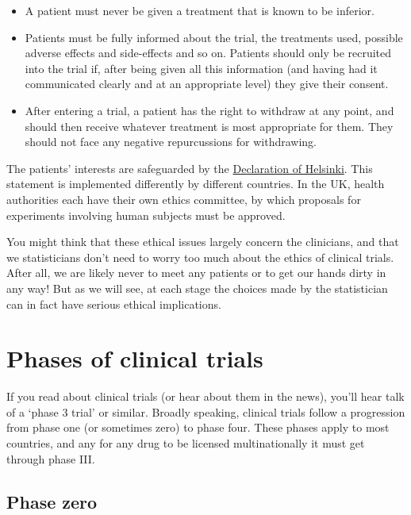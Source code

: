 \documentclass[
  openany]{book}
\providecommand{\tightlist}{%
  \setlength{\itemsep}{0pt}\setlength{\parskip}{0pt}}
\theoremstyle{definition}
\theoremstyle{definition}
\theoremstyle{definition}
\theoremstyle{definition}
\theoremstyle{remark}
\begin{document}
\begin{itemize}
\tightlist
\item
  A patient must never be given a treatment that is known to be inferior.
\item
  Patients must be fully informed about the trial, the treatments used, possible adverse effects and side-effects and so on. Patients should only be recruited into the trial if, after being given all this information (and having had it communicated clearly and at an appropriate level) they give their consent.
\item
  After entering a trial, a patient has the right to withdraw at any point, and should then receive whatever treatment is most appropriate for them. They should not face any negative repurcussions for withdrawing.
\end{itemize}

The patients' interests are safeguarded by the \href{https://www.wma.net/policies-post/wma-declaration-of-helsinki-ethical-principles-for-medical-research-involving-human-subjects/}{Declaration of Helsinki}. This statement is implemented differently by different countries. In the UK, health authorities each have their own ethics committee, by which proposals for experiments involving human subjects must be approved.

You might think that these ethical issues largely concern the clinicians, and that we statisticians don't need to worry too much about the ethics of clinical trials. After all, we are likely never to meet any patients or to get our hands dirty in any way! But as we will see, at each stage the choices made by the statistician can in fact have serious ethical implications.

\hypertarget{phases-of-clinical-trials}{%
\section{Phases of clinical trials}\label{phases-of-clinical-trials}}

If you read about clinical trials (or hear about them in the news), you'll hear talk of a `phase 3 trial' or similar. Broadly speaking, clinical trials follow a progression from phase one (or sometimes zero) to phase four. These phases apply to most countries, and any for any drug to be licensed multinationally it must get through phase III.

\hypertarget{phase-zero}{%
\subsection*{Phase zero}\label{phase-zero}}
\end{document}
